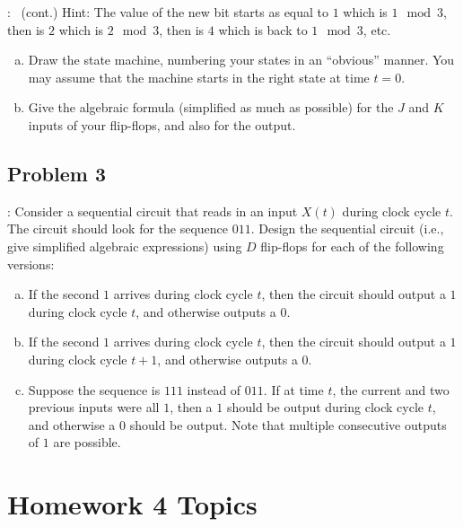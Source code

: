 \documentclass{../slides}
\begin{document}
\begin{frame}{\secname: \subsecname\ (cont.)}
    Hint: The value of the new bit starts as equal to $1$ which is $1\mod 3$, then is $2$ which is $2\mod 3$, then is $4$ which is back to $1\mod 3$, etc.
    \begin{enumerate}[(a)]
        \item Draw the state machine, numbering your states in an \enquote{obvious} manner. You may assume that the machine starts in the right state at time $t=0$.
        \item Give the algebraic formula (simplified as much as possible) for the $J$ and $K$ inputs of your flip-flops, and also for the output.
    \end{enumerate}
\end{frame}

\subsection{Problem 3}
\begin{frame}{\secname: \subsecname}
    Consider a sequential circuit that reads in an input $X(t)$ during clock cycle $t$. The circuit should look for the sequence $011$. Design the sequential circuit (i.e., give simplified algebraic expressions) using $D$ flip-flops for each of the following versions:
    \begin{enumerate}[(a)]
        \item If the second $1$ arrives during clock cycle $t$, then the circuit should output a $1$ during clock cycle $t$, and otherwise outputs a $0$.
        \item If the second $1$ arrives during clock cycle $t$, then the circuit should output a $1$ during clock cycle $t+1$, and otherwise outputs a $0$.
        \item Suppose the sequence is $111$ instead of $011$. If at time $t$, the current and two previous inputs were all $1$, then a $1$ should be output during clock cycle $t$, and otherwise a $0$ should be output. Note that multiple consecutive outputs of $1$ are possible.
    \end{enumerate}
\end{frame}

\section{Homework 4 Topics}
\end{document}
